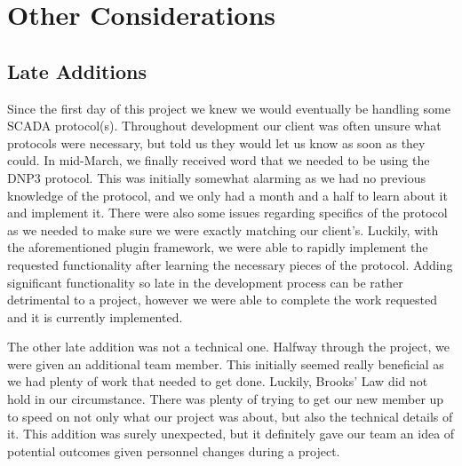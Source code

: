 \chapter{Other Considerations}

\section{Late Additions}
Since the first day of this project we knew we would eventually be handling some SCADA protocol(s). Throughout development our client was often unsure what protocols were necessary, but told us they would let us know as soon as they could. In mid-March, we finally received word that we needed to be using the DNP3 protocol. This was initially somewhat alarming as we had no previous knowledge of the protocol, and we only had a month and a half to learn about it and implement it. There were also some issues regarding specifics of the protocol as we needed to make sure we were exactly matching our client's. Luckily, with the aforementioned plugin framework, we were able to rapidly implement the requested functionality after learning the necessary pieces of the protocol. Adding significant functionality so late in the development process can be rather detrimental to a project, however we were able to complete the work requested and it is currently implemented.


The other late addition was not a technical one. Halfway through the project, we were given an additional team member. This initially seemed really beneficial as we had plenty of work that needed to get done. Luckily, Brooks' Law did not hold in our circumstance. There was plenty of trying to get our new member up to speed on not only what our project was about, but also the technical details of it. This addition was surely unexpected, but it definitely gave our team an idea of potential outcomes given personnel changes during a project.
